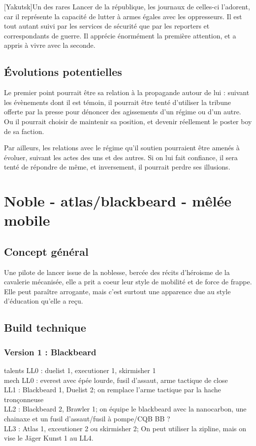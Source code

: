 \documentclass[10pt,a4paper]{article}
\begin{document}
[Yakutsk]Un des rares Lancer de la république, les journaux de celles-ci l'adorent, car il représente la capacité de lutter à armes égales avec les oppresseurs. Il est tout autant suivi par les services de sécurité que par les reporters et correspondants de guerre. Il apprécie énormément la première attention, et a appris à vivre avec la seconde. 
\subsection{Évolutions potentielles}
Le premier point pourrait être sa relation à la propagande autour de lui : suivant les évènements dont il est témoin, il pourrait être tenté d'utiliser la tribune offerte par la presse pour dénoncer des agissements d'un régime ou d'un autre. Ou il pourrait choisir de maintenir sa position, et devenir réellement le poster boy de sa faction.

Par ailleurs, les relations avec le régime qu'il soutien pourraient être amenés à évoluer, suivant les actes des uns et des autres. Si on lui fait confiance, il sera tenté de répondre de même, et inversement, il pourrait perdre ses illusions.
\section{Noble - atlas/blackbeard - mêlée mobile}
\subsection{Concept général}
Une pilote de lancer issue de la noblesse, bercée des récits d'héroisme de la cavalerie mécanisée, elle a prit a coeur leur style de mobilité et de force de frappe. Elle peut paraître arrogante, mais c'est surtout une apparence due au style d'éducation qu'elle a reçu.
\subsection{Build technique}
\subsubsection{Version 1 : Blackbeard}
talents LL0 : duelist 1, executioner 1, skirmisher 1\\
mech LL0 : everest avec épée lourde, fusil d'assaut, arme tactique de close\\
LL1 : Blackbeard 1, Duelist 2; on remplace l'arme tactique par la hache tronçonneuse\\
LL2 : Blackbeard 2, Brawler 1; on équipe le blackbeard avec la nanocarbon, une chainaxe et un fusil d'assaut/fusil à pompe/CQB BB ? \\
LL3 : Atlas 1, exceutioner 2 ou skirmisher 2; On peut utiliser la zipline, mais on vise le Jäger Kunst 1 au LL4.
\end{document}
